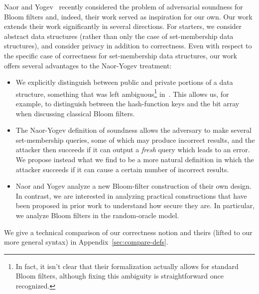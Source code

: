  Naor and
Yogev~\cite{naor2015bloom} recently considered the problem of
adversarial soundness for Bloom filters and, indeed,
their work served as inspiration for our own. Our work extends
their work significantly in several directions. For starters, we
consider abstract data structures (rather than only the case of
set-membership data structures), and consider privacy in addition to
correctness. Even with respect to the specific case of correctness for
set-membership data structures, our work offers several advantages
to the Naor-Yogev treatment:
\begin{itemize}
\item We explicitly distinguish between public and private
    portions of a data structure, something that was left
    ambiguous\footnote{In fact, it isn't clear that their formalization actually allows for standard Bloom filters, although fixing this ambiguity is straightforward once recognized.} in~\cite{naor2015bloom}. This allows us, for
    example, to distinguish between the hash-function keys and
    the bit array when discussing classical Bloom filters.
\item The Naor-Yogev definition of soundness allows the
    adversary to make several set-membership queries, some of
    which may produce incorrect results, and the attacker then
    succeeds if it can output a \emph{fresh} query which leads
    to an error. We propose instead what we find to be a more
    natural definition in which the attacker succeeds if it can
    cause a certain number of incorrect results.
\item Naor and Yogev analyze a new Bloom-filter construction of
    their own design. In contrast, we are interested in
    analyzing practical constructions that have been proposed in
    prior work to understand how secure they are. In particular,
    we analyze Bloom filters in the random-oracle model.
\end{itemize}

We give a technical comparison of our correctness notion and theirs (lifted to our more general syntax)
in Appendix~\ref{sec:compare-defs}. 



